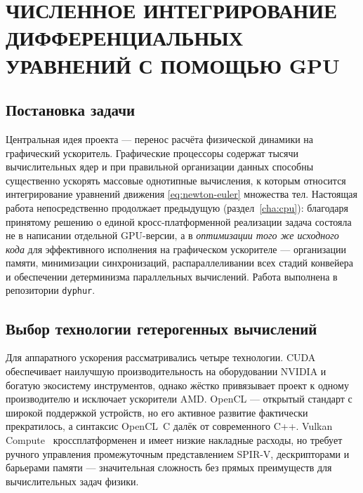 \chapter{ЧИСЛЕННОЕ ИНТЕГРИРОВАНИЕ ДИФФЕРЕНЦИАЛЬНЫХ УРАВНЕНИЙ С ПОМОЩЬЮ GPU}
\label{cha:gpu}

\section{Постановка задачи}

Центральная идея проекта --- перенос расчёта физической динамики на графический
ускоритель. Графические процессоры содержат тысячи вычислительных ядер и при
правильной организации данных способны существенно ускорять массовые однотипные
вычисления, к которым относится интегрирование уравнений движения
\eqref{eq:newton-euler} множества тел. Настоящая работа непосредственно
продолжает предыдущую (раздел~\ref{cha:cpu}): благодаря принятому решению о
единой кросс-платформенной реализации задача состояла не в написании отдельной
GPU-версии, а в \emph{оптимизации того же исходного кода} для эффективного
исполнения на графическом ускорителе --- организации памяти, минимизации
синхронизаций, распараллеливании всех стадий конвейера и обеспечении
детерминизма параллельных вычислений. Работа выполнена в репозитории
\texttt{dyphur}.

\section{Выбор технологии гетерогенных вычислений}

Для аппаратного ускорения рассматривались четыре технологии. CUDA обеспечивает
наилучшую производительность на оборудовании NVIDIA и богатую экосистему
инструментов, однако жёстко привязывает проект к одному производителю и
исключает ускорители AMD. OpenCL --- открытый стандарт с широкой поддержкой
устройств, но его активное развитие фактически прекратилось, а синтаксис
OpenCL~C далёк от современного C++. Vulkan Compute~\cite{vulkan}
кроссплатформенен и имеет низкие накладные расходы, но требует ручного
управления промежуточным представлением SPIR-V, дескрипторами и барьерами
памяти --- значительная сложность без прямых преимуществ для вычислительных
задач физики.

